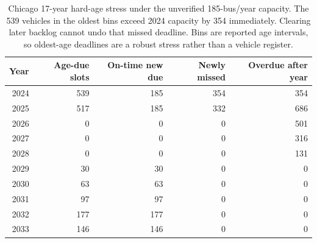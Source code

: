 \begin{table}[htbp]
\centering
\begin{tabular}{@{}rrrrr@{}}
\toprule
Year & Age-due slots & On-time new due & Newly missed & Overdue after year\\
\midrule
2024 & 539 & 185 & 354 & 354\\
2025 & 517 & 185 & 332 & 686\\
2026 & 0 & 0 & 0 & 501\\
2027 & 0 & 0 & 0 & 316\\
2028 & 0 & 0 & 0 & 131\\
2029 & 30 & 30 & 0 & 0\\
2030 & 63 & 63 & 0 & 0\\
2031 & 97 & 97 & 0 & 0\\
2032 & 177 & 177 & 0 & 0\\
2033 & 146 & 146 & 0 & 0\\
\bottomrule
\end{tabular}
\caption{Chicago 17-year hard-age stress under the unverified 185-bus/year capacity. The 539 vehicles in the oldest bins exceed 2024 capacity by 354 immediately. Clearing later backlog cannot undo that missed deadline. Bins are reported age intervals, so oldest-age deadlines are a robust stress rather than a vehicle register.}
\label{tab:chicago_age}
\end{table}
